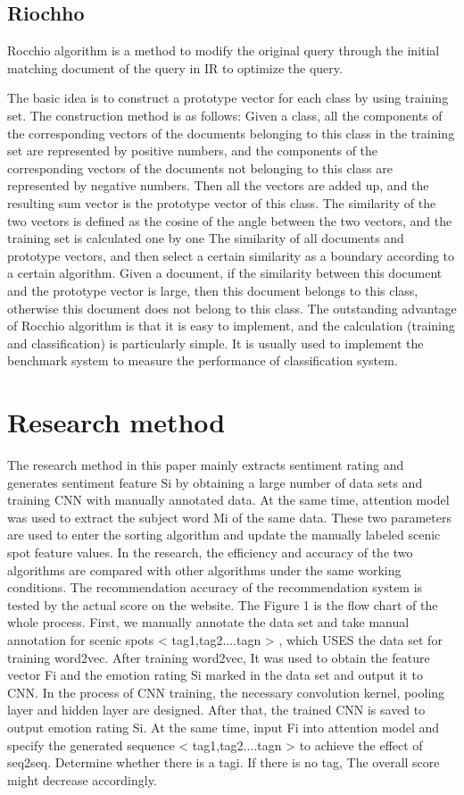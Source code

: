 \documentclass[conference]{IEEEtran}
\begin{document}
\subsection{Riochho}
Rocchio algorithm is a method to modify the original query through the initial matching document of the query in IR to optimize the query.

The basic idea is to construct a prototype vector for each class by using training set. The construction method is as follows:
Given a class, all the components of the corresponding vectors of the documents belonging to this class in the training set are represented by positive numbers, and the components of the corresponding vectors of the documents not belonging to this class are represented by negative numbers. Then all the vectors are added up, and the resulting sum vector is the prototype vector of this class. The similarity of the two vectors is defined as the cosine of the angle between the two vectors, and the training set is calculated one by one The similarity of all documents and prototype vectors, and then select a certain similarity as a boundary according to a certain algorithm. Given a document, if the similarity between this document and the prototype vector is large, then this document belongs to this class, otherwise this document does not belong to this class. The outstanding advantage of Rocchio algorithm is that it is easy to implement, and the calculation (training and classification) is particularly simple. It is usually used to implement the benchmark system to measure the performance of classification system.


\section{Research method}
The research method in this paper mainly extracts sentiment rating and generates sentiment feature Si by obtaining a large number of data sets and training CNN with manually annotated data. At the same time, attention model was used to extract the subject word Mi of the same data. These two parameters are used to enter the sorting algorithm and update the manually labeled scenic spot feature values. In the research, the efficiency and accuracy of the two algorithms are compared with other algorithms under the same working conditions. The recommendation accuracy of the recommendation system is tested by the actual score on the website. The Figure 1 is the flow chart of the whole process. First, we manually annotate the data set and take manual annotation for scenic spots < tag1,tag2....tagn > , which USES the data set for training word2vec. After training word2vec, It was used to obtain the feature vector Fi and the emotion rating Si marked in the data set and output it to CNN. In the process of CNN training, the necessary convolution kernel, pooling layer and hidden layer are designed. After that, the trained CNN is saved to output emotion rating Si. At the same time, input Fi into attention model and specify the generated sequence < tag1,tag2....tagn > to achieve the effect of seq2seq. Determine whether there is a tagi. If there is no tag, The overall score might decrease accordingly\cite{7}.
\end{document}
